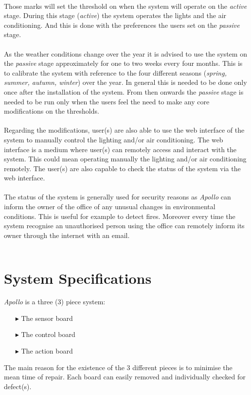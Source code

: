 \documentclass[12pt,a4paper]{report}
\begin{document}
\ \\
Those marks will set the threshold on when the system will operate on the \emph{active} stage. During this stage (\textit{active}) the system operates the lights and the air conditioning. And this is done with the preferences the users set on the \emph{passive} stage.\\
\ \\
As the weather conditions change over the year it is advised to use the system on the \emph{passive} stage approximately for one to two weeks every four months. This is to calibrate the system with reference to the four different seasons (\textit{spring, summer, autumn, winter}) over the year. In general this is needed to be done only once after the installation of the system. From then onwards the \emph{passive} stage is needed to be run only when the users feel the need to make any core modifications on the thresholds.\\
\ \\
Regarding the modifications, user(s) are also able to use the web interface of the system to manually control the lighting and/or air conditioning. The web interface is a medium where user(s) can remotely access and interact with the system. This could mean operating manually the lighting and/or air conditioning remotely. The user(s) are also capable to check the status of the system via the web interface.\\
\ \\
The status of the system is generally used for security reasons as \emph{Apollo} can inform the owner of the office of any unusual changes in environmental conditions. This is useful for example to detect fires. Moreover every time the system recognise an unauthorised person using the office can remotely inform its owner through the internet with an email.\\
\ \\
%
\newpage
%
\chapter{System Specifications}
%
\emph{Apollo} is a three (3) piece system:
%
\begin{itemize}
\item[$\blacktriangleright$] The sensor board
\item[$\blacktriangleright$] The control board
\item[$\blacktriangleright$] The action board
\end{itemize}
The main reason for the existence of the 3 different pieces is to minimise the mean time of repair. Each board can easily removed and individually checked for defect(s).
%
\end{document}
